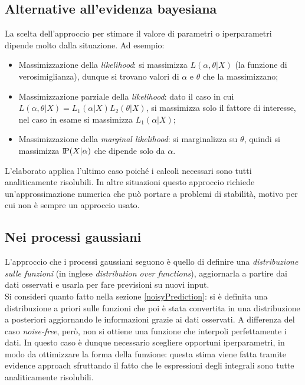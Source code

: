 \newpage

\subsection{Alternative all'evidenza bayesiana}
La scelta dell'approccio per stimare il valore di parametri o iperparametri dipende molto dalla situazione. Ad esempio:
\begin{itemize}
    \item Massimizzazione della \textit{likelihood}:
    si massimizza $L(\alpha, \theta | X)$ (la funzione di verosimiglianza), dunque si trovano valori di $\alpha$ e  $\theta$ che la massimizzano;
    \item Massimizzazione parziale della \textit{likelihood}:
    dato il caso in cui $L(\alpha, \theta |X)=L_1(\alpha | X)L_2(\theta|X)$, si massimizza solo il fattore di interesse, nel caso in esame si massimizza $L_1(\alpha | X)$;
    \item Massimizzazione della \textit{marginal likelihood}:
    si marginalizza su $\theta$, quindi si massimizza $\text{I\kern-0.18em P}(X|\alpha)$ che dipende solo da $\alpha$.
\end{itemize}
L'elaborato applica l'ultimo caso poiché i calcoli necessari sono tutti analiticamente risolubili. In altre situazioni questo approccio richiede un'approssimazione numerica che può portare a problemi di stabilità, motivo per cui non è sempre un approccio usato.




\subsection{Nei processi gaussiani}\label{neiProcessiGaussiani}
L'approccio che i processi gaussiani seguono è quello di definire una \textit{distribuzione sulle funzioni} (in inglese \textit{distribution over functions}), aggiornarla a partire dai dati osservati e usarla per fare previsioni su nuovi input. \\
Si consideri quanto fatto nella sezione \ref{noisyPrediction}: si è definita una distribuzione a priori sulle funzioni che poi è stata convertita in una distribuzione a posteriori aggiornando le informazioni grazie ai dati osservati. A differenza del caso \textit{noise-free}, però, non si ottiene una funzione che interpoli perfettamente i dati. In questo caso è dunque necessario scegliere opportuni iperparametri, in modo da ottimizzare la forma della funzione: questa stima viene fatta tramite evidence approach sfruttando il fatto che le espressioni degli integrali sono tutte analiticamente risolubili.\\



